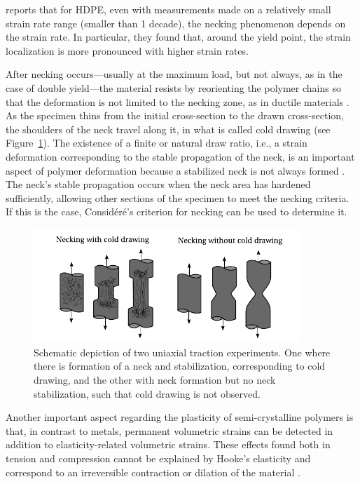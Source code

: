 \cite{yeKinematicStudyNecking2015} reports that for HDPE, even with measurements made on a relatively small strain rate range (smaller than 1 decade), the necking phenomenon depends on the strain rate.
In particular, they found that, around the yield point, the strain localization is more pronounced with higher strain rates.

After necking occurs—usually at the maximum load, but not always, as in the case of double yield—the material resists by reorienting the polymer chains so that the deformation is not limited to the necking zone, as in ductile materials \citep{callister2014materials}.
As the specimen thins from the initial cross-section to the drawn cross-section, the shoulders of the neck travel along it, in what is called cold drawing (see Figure~\ref{fig:natural_draw_ratio}).
The existence of a finite or natural draw ratio, i.e., a strain deformation corresponding to the stable propagation of the neck, is an important aspect of polymer deformation because a stabilized neck is not always formed \citep{wardIntroductionMechanicalProperties2004}.
The neck's stable propagation occurs when the neck area has hardened sufficiently, allowing other sections of the specimen to meet the necking criteria.
If this is the case, Considéré's criterion for necking can be used to determine it.
\begin{figure}[hbtp]
    \centering
    \includegraphics[width=0.9\textwidth]{figures/natural_draw_ratio}
    \caption{Schematic depiction of two uniaxial traction experiments. One where there is formation of a neck and stabilization, corresponding to cold drawing, and the other with neck formation but no neck stabilization, such that cold drawing is not observed.}
\label{fig:natural_draw_ratio}
\end{figure}

Another important aspect regarding the plasticity of semi-crystalline polymers is that, in contrast to metals, permanent volumetric strains can be detected in addition to elasticity-related volumetric strains.
These effects found both in tension and compression cannot be explained by Hooke's elasticity and correspond to an irreversible contraction or dilation of the material \citep{cangemiTwoPhaseModelMechanical2001,polanco-loriaConstitutiveModelThermoplastics2010}.

